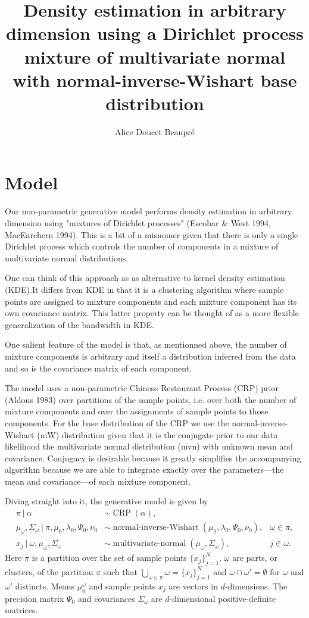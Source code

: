\documentclass[11pt, oneside]{article}   	%
\title{Density estimation in arbitrary dimension using a Dirichlet process mixture of multivariate normal with normal-inverse-Wishart base distribution}
\author{Alice Doucet Beaupr\'e}
\begin{document}
\maketitle
\section{Model}
Our non-parametric generative model performs density estimation in arbitrary dimension using "mixtures of Dirichlet processes" (Escobar \& West 1994, MacEarchern 1994). This is a bit of a misnomer given that there is only a single Dirichlet process which controls the number of components in a mixture of multivariate normal distributions.

One can think of this approach as as alternative to kernel density estimation (KDE).It differs from KDE in that it is a clustering algorithm where sample points are assigned to mixture components and each mixture component has its own covariance matrix. This latter property can be thought of as a more flexible generalization of the bandwidth in KDE.

One salient feature of the model is that, as mentionned above, the number of mixture components is arbitrary and itself a distribution inferred from the data and so is the covariance matrix of each component.

The model uses a non-parametric Chinese Restaurant Process (CRP) prior (Aldous 1983) over partitions of the sample points, i.e. over both the number of mixture components and over the assignments of sample points to those components. For the base distribution of the CRP we use the normal-inverse-Wishart (niW) distribution given that it is the conjugate prior to our data likelihood the multivariate normal distribution (mvn) with unknown mean and covariance. Conjugacy is desirable because it greatly simplifies the accompanying algorithm because we are able to integrate exactly over the parameters—the mean and covariance—of each mixture component.

Diving straight into it, the generative model is given by
\begin{equation}\begin{aligned}
\pi~\vert~\alpha & \sim \operatorname{CRP}(\alpha), \\
\mu_\omega, \Sigma_\omega ~\vert~\pi,\mu_0, \lambda_0, \Psi_0, \nu_0 & \sim \operatorname{normal-inverse-Wishart}(\mu_0, \lambda_0, \Psi_0, \nu_0), &\omega\in\pi,\\
x_j~\vert~\omega, \mu_\omega, \Sigma_\omega & \sim \operatorname{multivariate-normal}(\mu_\omega, \Sigma_\omega),& j\in\omega.
\label{eq:model}\end{aligned}\end{equation}
Here $\pi$ is a partition over the set of sample points $\lbrace x_j\rbrace_{j=1}^N$. $\omega$ are parts, or clusters, of the partition $\pi$ such that $\bigcup_{\omega\in\pi}\omega = \lbrace x_j\rbrace_{j=1}^N$ and $\omega \cap\omega' = \emptyset$ for $\omega$ and $\omega'$ distincts. Means $\mu_0^\omega$ and sample points $x_j$ are vectors in $d$-dimensions. The precision matrix $\Psi_0$ and covariances $\Sigma_\omega$ are $d$-dimensional positive-definite matrices.
\end{document}
